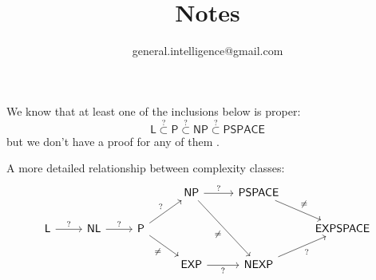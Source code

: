 

\title{Notes}
\author{ {\footnotesize general.intelligence@gmail.com}}


	
\maketitle

We know that at least one of the inclusions below is proper:
\begin{equation}
\mathsf{L} \stackrel{?}{\subset} \mathsf{P} \stackrel{?}{\subset} \mathsf{NP} \stackrel{?}{\subset} \mathsf{PSPACE}
\end{equation}
but we don't have a proof for any of them \parencite{Moore2011}. %

A more detailed relationship between complexity classes:
\begin{equation}
\begin{tikzcd}[swap]
& & & \mathsf{NP} \arrow{r}[swap]{?} \arrow{ddr}{\neq} & \mathsf{PSPACE} \arrow{dr}[swap]{\neq} \\
\mathsf{L} \arrow{r}[swap]{?} & \mathsf{NL} \arrow{r}[swap]{?} & \mathsf{P} \arrow{ur}[swap]{?} \arrow{dr}{\neq} & & & \mathsf{EXPSPACE} \\
& & & \mathsf{EXP} \arrow{r}{?} & \mathsf{NEXP} \arrow{ur}{?} 
\end{tikzcd}
\end{equation}

